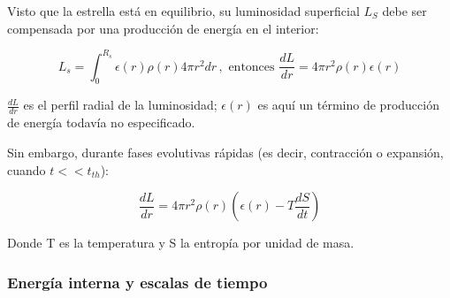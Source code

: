 \documentclass[11pt,letterpaper]{article}
\begin{document}
Visto que la estrella está en equilibrio, su luminosidad superficial $L_S$ debe ser compensada por una producción de energía en el interior:

\begin{equation}
    L_s = \int_{0}^{R_s} \epsilon(r) \rho(r) 4 \pi r^2 dr \, , \text{ entonces } \frac{dL}{dr} = 4 \pi r^2 \rho(r) \epsilon(r)
\end{equation}

$\frac{dL}{dr}$ es el perfil radial de la luminosidad; $\epsilon (r)$ es aquí un término de producción de energía todavía no especificado.

Sin embargo, durante fases evolutivas rápidas (es decir, contracción o expansión, cuando $t << t_{th}$):

\begin{equation}
    \frac{dL}{dr} = 4 \pi r^2 \rho(r) \left( \epsilon(r) - T \frac{dS}{dt} \right)
\end{equation}

Donde T es la temperatura y S la entropía por unidad de masa.

\subsubsection{Energía interna y escalas de tiempo}
\end{document}
